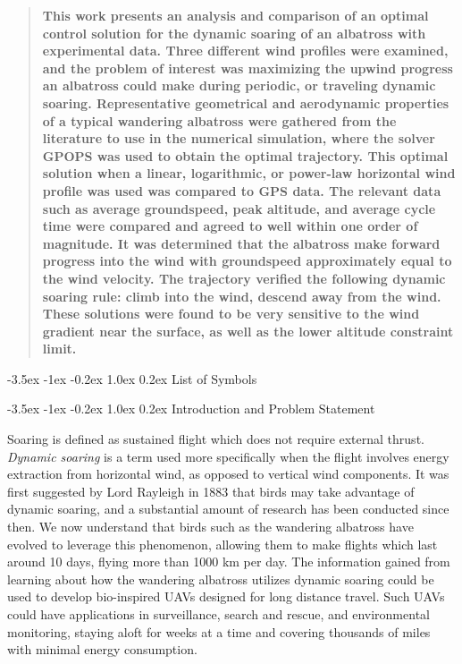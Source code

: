 \documentclass[11pt,letterpaper,onecolumn]{article}
\makeatletter
\renewcommand\section{\@startsection{section}{1}{\z@}%
{-3.5ex \@plus-1ex \@minus-0.2ex}%
{1.0ex \@plus0.2ex}%
{\fontsize{12pt}{12pt}\selectfont\bfseries\sffamily}}
\def\listofsymbols{}
\makeatother
\begin{document}
  \begin{abstract}
    \textbf{
      This work presents an analysis and comparison of an optimal control solution for the dynamic soaring of an albatross with experimental data.
      Three different wind profiles were examined, and the problem of interest was maximizing the upwind progress an albatross could make during periodic, or traveling dynamic soaring.
      Representative geometrical and aerodynamic properties of a typical wandering albatross were gathered from the literature to use in the numerical simulation, where the solver GPOPS was used to obtain the optimal trajectory.
      This optimal solution when a linear, logarithmic, or power-law horizontal wind profile was used was compared to GPS data.
      The relevant data such as average groundspeed, peak altitude, and average cycle time were compared and agreed to well within one order of magnitude.
      It was determined that the albatross make forward progress into the wind with groundspeed approximately equal to the wind velocity.
      The trajectory verified the following dynamic soaring rule: climb into the wind, descend away from the wind.
      These solutions were found to be very sensitive to the wind gradient near the surface, as well as the lower altitude constraint limit.
    }
  \end{abstract}

  \section{List of Symbols}

  \listofsymbols%

  \section{Introduction and Problem Statement}

  Soaring is defined as sustained flight which does not require external thrust.
  \textit{Dynamic soaring} is a term used more specifically when the flight involves energy extraction from horizontal wind, as opposed to vertical wind components.
  It was first suggested by Lord Rayleigh in 1883 that birds may take advantage of dynamic soaring, and a substantial amount of research has been conducted since then.\cite{rayleigh.soaring.1883} We now understand that birds such as the wandering albatross have evolved to leverage this phenomenon, allowing them to make flights which last around 10 days, flying more than 1000 km per day.
  The information gained from learning about how the wandering albatross utilizes dynamic soaring could be used to develop bio-inspired UAVs designed for long distance travel.
  Such UAVs could have applications in surveillance, search and rescue, and environmental monitoring, staying aloft for weeks at a time and covering thousands of miles with minimal energy consumption\cite{richardson.highspeedrobotic.2012}.
\end{document}
